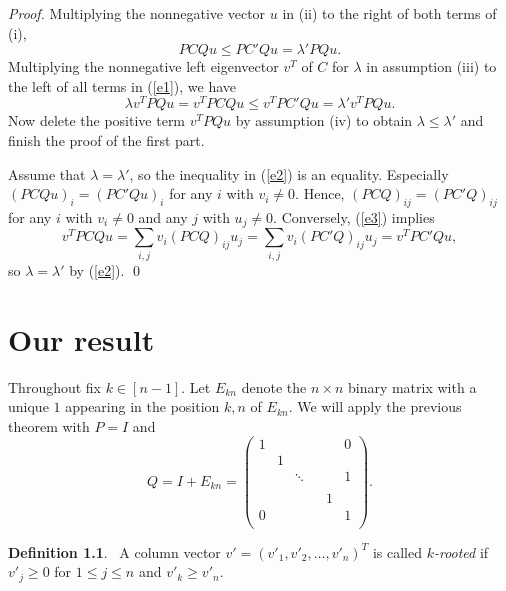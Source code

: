 \documentclass[12pt]{report}%
\theoremstyle{plain}
\theoremstyle{definition}
\newtheorem{defn}[thm]{Definition}
\begin{document}
\begin{proof}
            Multiplying the nonnegative vector $u$ in (ii) to the right of both terms of  (i),
        \begin{equation}
            \label{e1}
            PCQu\leq PC'Qu=\lambda'PQu.
        \end{equation}
        Multiplying the nonnegative left eigenvector $v^T$ of $C$ for $\lambda$ in assumption (iii) to the left of all terms  in (\ref{e1}), we have
        \begin{equation}
            \label{e2}
            \lambda v^TPQu=v^TPCQu\leq v^TPC'Qu=\lambda' v^TPQu.
        \end{equation}
        Now delete the positive term $v^TPQu$ by assumption (iv) to obtain $\lambda\leq \lambda'$ and finish the proof of the first part.



        Assume that $\lambda=\lambda'$, so the inequality in (\ref{e2}) is an equality.  Especially $(PCQu)_i=(PC'Qu)_i$ for any $i$ with $v_i\not=0.$ Hence, $(PCQ)_{ij}=(PC'Q)_{ij}$ for any $i$ with $v_i\not=0$ and any $j$ with $u_j\not=0.$
         Conversely, (\ref{e3}) implies $$v^TPCQu=\sum_{i,j} v_i(PCQ)_{ij}u_j=\sum_{i,j} v_i(PC'Q)_{ij}u_j=v^TPC'Qu,$$ so
            $\lambda=\lambda'$ by (\ref{e2}). \qed

 \end{proof}

\chapter{Our result}

 Throughout fix $k\in [n-1]$. Let $E_{kn}$ denote the $n\times n$ binary matrix with a unique $1$ appearing in the  position $k,n$ of $E_{kn}$. We will apply the previous theorem with $P=I$ and $$Q=I+E_{kn}=\begin{pmatrix}
1 &  & & &  & 0 \\
 & 1 &  &      &  &  \\
 &  & \ddots & &  & 1 \\
 &  &        & &  &  \\
  &  & & & 1 &  \\
0 &  & & &  & 1 \\
\end{pmatrix}.$$
\begin{defn}\label{v_rooted}
 ~A column vector $v'=(v'_1,v'_2,\ldots,v'_n)^T$ is called {\it $k$-rooted}  if $v'_{j} \geq 0$ for $1 \leq  j \leq n$ and $v'_k\geq v'_n.$
\end{defn}
\bigskip
\end{document}
